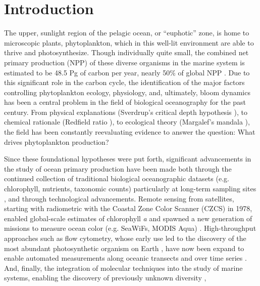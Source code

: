 \chapter{Introduction}
\raggedbottom
The upper, sunlight region of the pelagic ocean, or ``euphotic'' zone, is home to microscopic plants, phytoplankton, which in this well-lit environment are able to thrive and photosynthesize. Though individually quite small, the combined net primary production (NPP) of these diverse organisms in the marine system is estimated to be 48.5 Pg of carbon per year, nearly 50\% of global NPP \citep{Longhurst1995, Field1998}. Due to this significant role in the carbon cycle, the identification of the major factors controlling phytoplankton ecology, physiology, and, ultimately, bloom dynamics has been a central problem in the field of biological oceanography for the past century. From physical explanations (Sverdrup's critical depth hypothesis \citep{Sverdrup1953}), to chemical rationale (Redfield ratio \citep{Redfield1958}), to ecological theory (Margalef's mandala \citep{Margalef1978}), the field has been constantly reevaluating evidence to answer the question: What drives phytoplankton production? \par

Since these foundational hypotheses were put forth, significant advancements in the study of ocean primary production have been made both through the continued collection of traditional biological oceanographic datasets (e.g. chlorophyll, nutrients, taxonomic counts) particularly at long-term sampling sites \citep{Karl1996, Steinberg2001,Smith2003, Li1998}, and through technological advancements. Remote sensing from satellites, starting with radiometric with the Coastal Zone Color Scanner (CZCS) in 1978, enabled global-scale estimates of chlorophyll \textit{a} and spawned a new generation of missions to measure ocean color (e.g. SeaWiFs, MODIS Aqua) \citep{McClain2009}. High-throughput approaches such as flow cytometry, whose early use led to the discovery of the most abundant photosynthetic organism on Earth \citep{Chisholm1988}, have now been expand to enable automated measurements along oceanic transects \citep{Swalwell2011, Ribalet2015} and over time series \citep{Olson2003}.  And, finally, the integration of molecular techniques into the study of marine systems, enabling the discovery of previously unknown diversity \citep{Lopez-Garcia2001}, 
